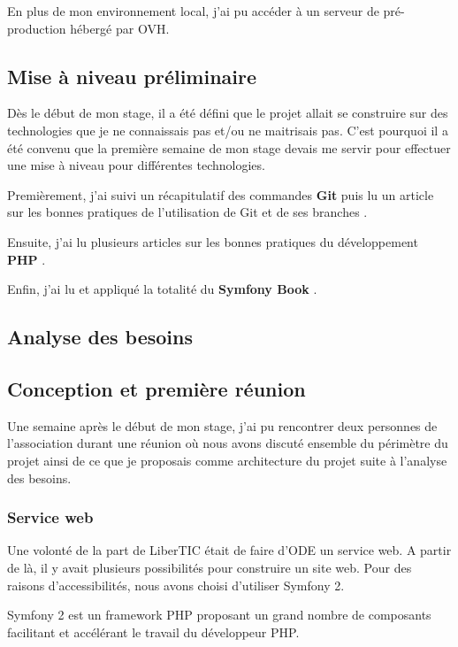 En plus de mon environnement local, j'ai pu accéder à un serveur de pré-production hébergé par OVH.

\subsection{Mise à niveau préliminaire}

Dès le début de mon stage, il a été défini que le projet allait se construire sur des technologies que je ne connaissais pas et/ou ne maitrisais pas. C'est pourquoi il a été convenu que la première semaine de mon stage devais me servir pour effectuer une mise à niveau pour différentes technologies.

Premièrement, j'ai suivi un récapitulatif des commandes \textbf{Git}  puis lu un article sur les bonnes pratiques de l'utilisation de Git et de ses branches .

Ensuite, j'ai lu plusieurs articles sur les bonnes pratiques du développement \textbf{PHP}  .

Enfin, j'ai lu et appliqué la totalité du \textbf{Symfony Book} .

\subsection{Analyse des besoins}

\subsection{Conception et première réunion}

Une semaine après le début de mon stage, j'ai pu rencontrer deux personnes de l'association durant une réunion où nous avons discuté ensemble du périmètre du projet ainsi de ce que je proposais comme architecture du projet suite à l'analyse des besoins.

\subsubsection*{Service web}

Une volonté de la part de LiberTIC était de faire d'ODE un service web. A partir de là, il y avait plusieurs possibilités pour construire un site web. Pour des raisons d'accessibilités, nous avons choisi d'utiliser Symfony 2.

Symfony 2 est un framework PHP proposant un grand nombre de composants facilitant et accélérant le travail du développeur PHP.

